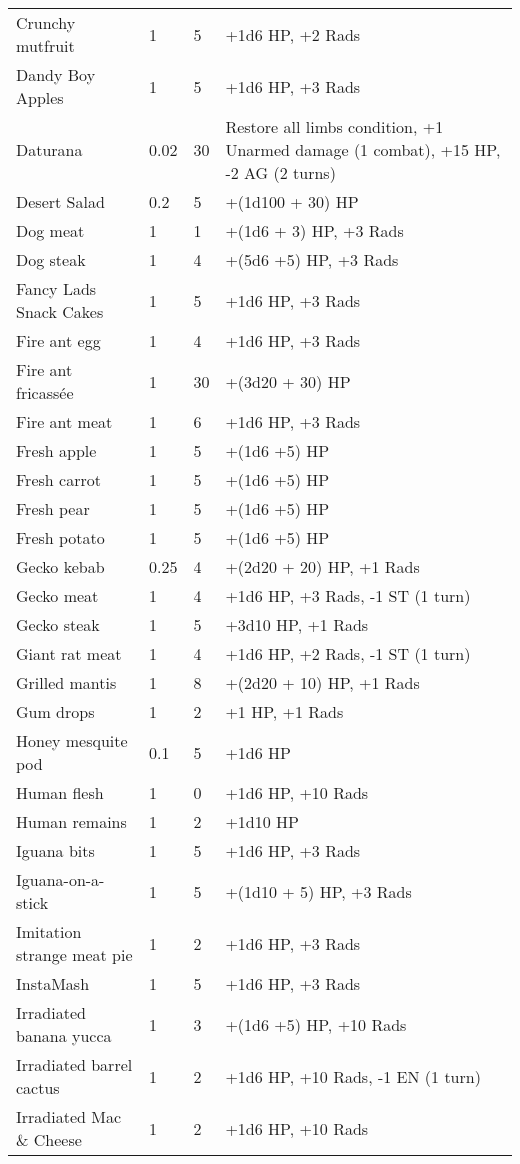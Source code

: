 \begin{longtable}{|p{4cm}|p{1.5cm}|p{1.5cm}|p{9cm}|}
Crunchy mutfruit & 1 & 5 & +1d6 HP, +2 Rads \\
Dandy Boy Apples & 1 & 5 & +1d6 HP, +3 Rads \\
Daturana & 0.02 & 30 & Restore all limbs condition, +1 Unarmed damage (1 combat), +15 HP, -2 AG (2 turns) \\
Desert Salad & 0.2 & 5 & +(1d100 + 30) HP \\
Dog meat & 1 & 1 & +(1d6 + 3) HP, +3 Rads \\
Dog steak & 1 & 4 & +(5d6 +5) HP, +3 Rads \\
Fancy Lads Snack Cakes & 1 & 5 & +1d6 HP, +3 Rads \\
Fire ant egg & 1 & 4 & +1d6 HP, +3 Rads \\
Fire ant fricassée & 1 & 30 & +(3d20 + 30) HP \\
Fire ant meat & 1 & 6 & +1d6 HP, +3 Rads \\
Fresh apple & 1 & 5 & +(1d6 +5) HP \\
Fresh carrot & 1 & 5 & +(1d6 +5) HP \\
Fresh pear & 1 & 5 & +(1d6 +5) HP \\
Fresh potato & 1 & 5 & +(1d6 +5) HP \\
Gecko kebab & 0.25 & 4 & +(2d20 + 20) HP, +1 Rads \\
Gecko meat & 1 & 4 & +1d6 HP, +3 Rads, -1 ST (1 turn) \\
Gecko steak & 1 & 5 & +3d10 HP, +1 Rads \\
Giant rat meat & 1 & 4 & +1d6 HP, +2 Rads, -1 ST (1 turn) \\
Grilled mantis & 1 & 8 & +(2d20 + 10) HP, +1 Rads \\
Gum drops & 1 & 2 & +1 HP, +1 Rads \\
Honey mesquite pod & 0.1 & 5 & +1d6 HP \\
Human flesh & 1 & 0 & +1d6 HP, +10 Rads \\
Human remains & 1 & 2 & +1d10 HP \\
Iguana bits & 1 & 5 & +1d6 HP, +3 Rads \\
Iguana-on-a-stick & 1 & 5 & +(1d10 + 5) HP, +3 Rads \\
Imitation strange meat pie & 1 & 2 & +1d6 HP, +3 Rads \\
InstaMash & 1 & 5 & +1d6 HP, +3 Rads \\
Irradiated banana yucca & 1 & 3 & +(1d6 +5) HP, +10 Rads \\
Irradiated barrel cactus & 1 & 2 & +1d6 HP, +10 Rads, -1 EN (1 turn) \\
Irradiated Mac \& Cheese & 1 & 2 & +1d6 HP, +10 Rads \\

\end{longtable}
